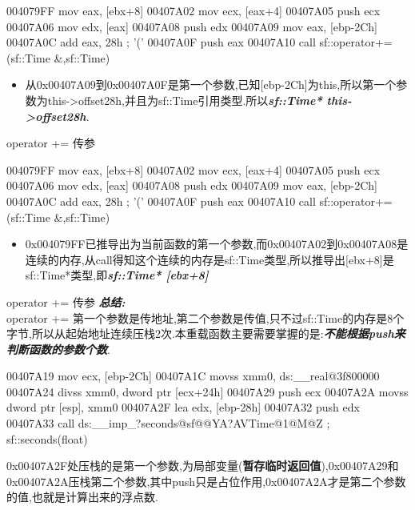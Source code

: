 \documentclass[AutoFakeBold,AutoFakeSlant]{beamer}
\begin{document}
\begin{frame}[fragile]
    \begin{x86asmcode}
        004079FF  mov   eax, [ebx+8]
        00407A02  mov   ecx, [eax+4]
        00407A05  push  ecx
        00407A06  mov   edx, [eax]
        00407A08  push  edx
        00407A09  mov   eax, [ebp-2Ch]
        00407A0C  add   eax, 28h ; '('
        00407A0F  push  eax
        00407A10  call  sf::operator+=(sf::Time &,sf::Time)\end{x86asmcode}
    \begin{itemize}
        \item 从0x00407A09到0x00407A0F是第一个参数,已知[ebp-2Ch]为this,所以第一个参数为this->offset28h,并且为sf::Time引用类型.所以\textbf{\textit{sf::Time* this->offset28h}}.
    \end{itemize}
\end{frame}

\begin{frame}[fragile]{operator += 传参}
    \begin{x86asmcode}
        004079FF  mov   eax, [ebx+8]
        00407A02  mov   ecx, [eax+4]
        00407A05  push  ecx
        00407A06  mov   edx, [eax]
        00407A08  push  edx
        00407A09  mov   eax, [ebp-2Ch]
        00407A0C  add   eax, 28h ; '('
        00407A0F  push  eax
        00407A10  call  sf::operator+=(sf::Time &,sf::Time)\end{x86asmcode}
    \begin{itemize}
        \item 0x004079FF已推导出为当前函数的第一个参数,而0x00407A02到0x00407A08是连续的内存,从call得知这个连续的内存是sf::Time类型,所以推导出[ebx+8]是sf::Time*类型,即\textit{\textbf{sf::Time* [ebx+8]}}
    \end{itemize}
\end{frame}

\begin{frame}[fragile]{operator += 传参}
    \textit{\textbf{总结:}} \\
    operator += 第一个参数是传地址,第二个参数是传值,只不过sf::Time的内存是8个字节,所以从起始地址连续压栈2次.本重载函数主要需要掌握的是:\textit{\textbf{不能根据push来判断函数的参数个数}}.
\end{frame}

\begin{frame}[fragile]
    \begin{x86asmcode}
        00407A19 mov    ecx, [ebp-2Ch]
        00407A1C movss  xmm0, ds:__real@3f800000
        00407A24 divss  xmm0, dword ptr [ecx+24h]
        00407A29 push   ecx
        00407A2A movss  dword ptr [esp], xmm0
        00407A2F lea    edx, [ebp-28h]
        00407A32 push   edx
        00407A33 call   ds:__imp_?seconds@sf@@YA?AVTime@1@M@Z ; sf::seconds(float) \end{x86asmcode}
    0x00407A2F处压栈的是第一个参数,为局部变量(\textbf{暂存临时返回值}),0x00407A29和0x00407A2A压栈第二个参数,其中push只是占位作用,0x00407A2A才是第二个参数的值,也就是计算出来的浮点数.
\end{frame}
\end{document}
